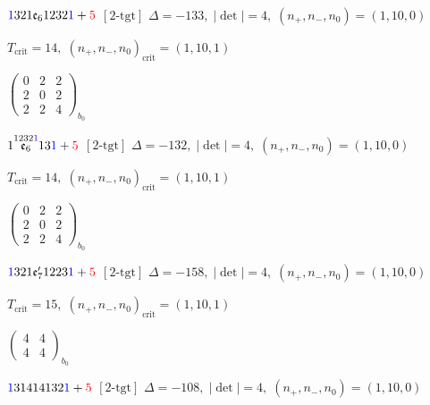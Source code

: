 \documentclass[10pt]{article}
\begin{document}
\smallskip

$\textcolor{blue}{1}321\mathfrak{e}_61232\textcolor{blue}{1}+\textcolor{red}{5}$ $\scriptstyle [2\text{-tgt}]$ \quad $\Delta=-133,\; |\det|=4,\; (n_+,n_-,n_0)=(1,10,0)$

\hspace{1em}$T_{\text{crit}}=14,\; (n_+,n_-,n_0)_{\text{crit}}=(1,10,1)$

\hspace{2em}$\left(\begin{smallmatrix}0 & 2 & 2 \\ 2 & 0 & 2 \\ 2 & 2 & 4\end{smallmatrix}\right)_{\!b_0}$

\smallskip

$1\overset{1232\textcolor{blue}{1}}{\mathfrak{e}_6}13\textcolor{blue}{1}+\textcolor{red}{5}$ $\scriptstyle [2\text{-tgt}]$ \quad $\Delta=-132,\; |\det|=4,\; (n_+,n_-,n_0)=(1,10,0)$

\hspace{1em}$T_{\text{crit}}=14,\; (n_+,n_-,n_0)_{\text{crit}}=(1,10,1)$

\hspace{2em}$\left(\begin{smallmatrix}0 & 2 & 2 \\ 2 & 0 & 2 \\ 2 & 2 & 4\end{smallmatrix}\right)_{\!b_0}$

\smallskip

$\textcolor{blue}{1}321\mathfrak{e}_7'1223\textcolor{blue}{1}+\textcolor{red}{5}$ $\scriptstyle [2\text{-tgt}]$ \quad $\Delta=-158,\; |\det|=4,\; (n_+,n_-,n_0)=(1,10,0)$

\hspace{1em}$T_{\text{crit}}=15,\; (n_+,n_-,n_0)_{\text{crit}}=(1,10,1)$

\hspace{2em}$\left(\begin{smallmatrix}4 & 4 \\ 4 & 4\end{smallmatrix}\right)_{\!b_0}$

\smallskip

$\textcolor{blue}{1}31414132\textcolor{blue}{1}+\textcolor{red}{5}$ $\scriptstyle [2\text{-tgt}]$ \quad $\Delta=-108,\; |\det|=4,\; (n_+,n_-,n_0)=(1,10,0)$
\end{document}
